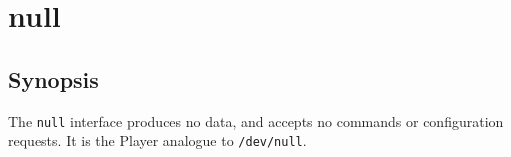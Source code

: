 \section{null} \label{sect:null}

\subsection*{Synopsis}

The {\tt null} interface produces no data, and accepts no commands or
configuration requests.  It is the Player analogue to {\tt /dev/null}.

